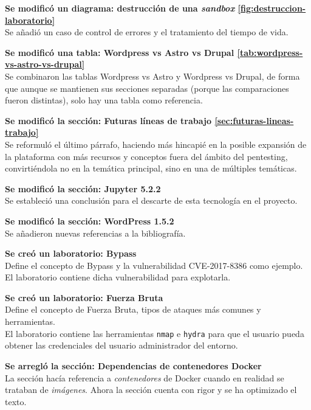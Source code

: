         \textbf{Se modificó un diagrama: destrucción de una \textit{sandbox} \ref{fig:destruccion-laboratorio}} \\
        Se añadió un caso de control de errores y el tratamiento del tiempo de vida.

        \textbf{Se modificó una tabla: Wordpress vs Astro vs Drupal \ref{tab:wordpress-vs-astro-vs-drupal}} \\
        Se combinaron las tablas Wordpress vs Astro y Wordpress vs Drupal, de forma que aunque se mantienen sus secciones separadas (porque las comparaciones fueron distintas), solo hay una tabla como referencia.

        \textbf{Se modificó la sección: Futuras líneas de trabajo \ref{sec:futuras-lineas-trabajo}} \\
        Se reformuló el último párrafo, haciendo más hincapié en la posible expansión de la plataforma con más recursos y conceptos fuera del ámbito del pentesting, convirtiéndola no en la temática principal, sino en una de múltiples temáticas.

        \textbf{Se modificó la sección: Jupyter 5.2.2} \\
        Se estableció una conclusión para el descarte de esta tecnología en el proyecto.

        \textbf{Se modificó la sección: WordPress 1.5.2} \\
        Se añadieron nuevas referencias a la bibliografía.

        \textbf{Se creó un laboratorio: Bypass} \\
        Define el concepto de Bypass y la vulnerabilidad CVE-2017-8386 como ejemplo. \\
        El laboratorio contiene dicha vulnerabilidad para explotarla.
        
        \textbf{Se creó un laboratorio: Fuerza Bruta} \\
        Define el concepto de Fuerza Bruta, tipos de ataques más comunes y herramientas. \\
        El laboratorio contiene las herramientas \texttt{nmap} e \texttt{hydra} para que el usuario pueda obtener las credenciales del usuario administrador del entorno.
        
        \textbf{Se arregló la sección: Dependencias de contenedores Docker} \\
        La sección hacía referencia a \textit{contenedores} de Docker cuando en realidad se trataban de \textit{imágenes}. Ahora la sección cuenta con rigor y se ha optimizado el texto.

